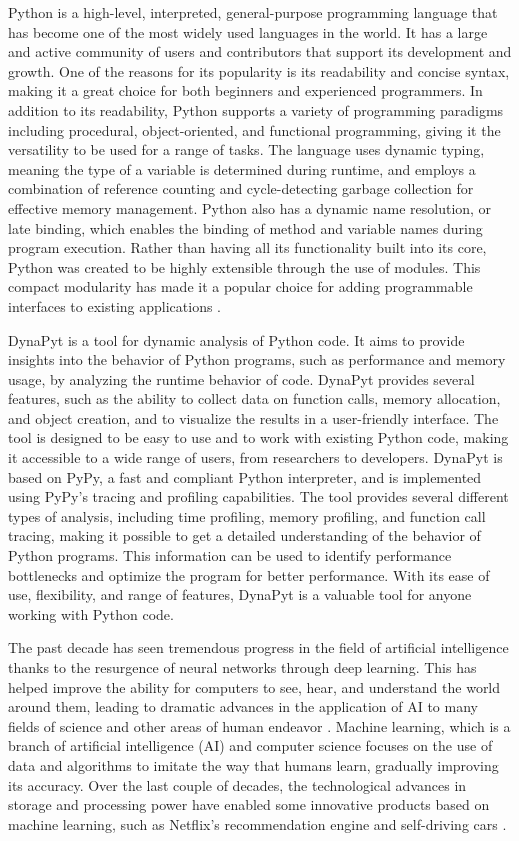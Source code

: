 Python is a high-level, interpreted, general-purpose programming language that has become one of the most widely used languages in the world. It has a large and active community of users and contributors that support its development and growth. One of the reasons for its popularity is its readability and concise syntax, making it a great choice for both beginners and experienced programmers. In addition to its readability, Python supports a variety of programming paradigms including procedural, object-oriented, and functional programming, giving it the versatility to be used for a range of tasks. The language uses dynamic typing, meaning the type of a variable is determined during runtime, and employs a combination of reference counting and cycle-detecting garbage collection for effective memory management. Python also has a dynamic name resolution, or late binding, which enables the binding of method and variable names during program execution. Rather than having all its functionality built into its core, Python was created to be highly extensible through the use of modules. This compact modularity has made it a popular choice for adding programmable interfaces to existing applications \cite{Python_language_wiki}.

DynaPyt is a tool for dynamic analysis of Python code. It aims to provide insights into the behavior of Python programs, such as performance and memory usage, by analyzing the runtime behavior of code. DynaPyt provides several features, such as the ability to collect data on function calls, memory allocation, and object creation, and to visualize the results in a user-friendly interface. The tool is designed to be easy to use and to work with existing Python code, making it accessible to a wide range of users, from researchers to developers. DynaPyt is based on PyPy, a fast and compliant Python interpreter, and is implemented using PyPy's tracing and profiling capabilities. The tool provides several different types of analysis, including time profiling, memory profiling, and function call tracing, making it possible to get a detailed understanding of the behavior of Python programs. This information can be used to identify performance bottlenecks and optimize the program for better performance.  With its ease of use, flexibility, and range of features, DynaPyt is a valuable tool for anyone working with Python code. \cite{DynaPyt2022}

The past decade has seen tremendous progress in the field of artificial intelligence thanks to the resurgence of neural networks through deep learning. This has helped improve the ability for computers to see, hear, and understand the world around them, leading to dramatic advances in the application of AI to many fields of science and other areas of human endeavor \cite{Machine_Learning_decade}. Machine learning, which is a branch of artificial intelligence (AI) and computer science focuses on the use of data and algorithms to imitate the way that humans learn, gradually improving its accuracy. Over the last couple of decades, the technological advances in storage and processing power have enabled some innovative products based on machine learning, such as Netflix’s recommendation engine and self-driving cars \cite{Machine_Learning}.

